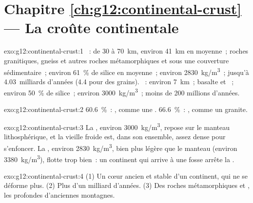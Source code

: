 \section*{Chapitre \ref{ch:g12:continental-crust} --- La croûte continentale}

\begin{solution}{exo:g12:continental-crust:1}
~: de 30 à \qty{70}{km}, environ \qty{41}{km} en
moyenne~; roches granitiques, gneiss et autres roches métamorphiques et
 sous une couverture sédimentaire~; environ \qty{61}{\percent}
de silice en moyenne~; environ \qty{2830}{kg/m^3}~; jusqu'à
4.03~milliards d'années (4.4 pour des grains). ~: environ
\qty{7}{km}~; basalte et ~; environ \qty{50}{\percent} de silice~;
environ \qty{3000}{kg/m^3}~; moins de 200 millions d'années.
\end{solution}

\begin{solution}{exo:g12:continental-crust:2}
\qty{60.6}{\percent}~: , comme une .
\qty{66.6}{\percent}~: , comme un granite.
\end{solution}

\begin{solution}{exo:g12:continental-crust:3}
La , environ \qty{3000}{kg/m^3}, repose sur le manteau
lithosphérique, et la vieille  froide est, dans son
ensemble, assez dense pour s'enfoncer. La , environ
\qty{2830}{kg/m^3}, bien plus légère que le manteau (environ
\qty{3380}{kg/m^3}), flotte trop bien~: un continent qui arrive à une fosse
arrête la .
\end{solution}

\begin{solution}{exo:g12:continental-crust:4}
(1) Un cœur ancien et stable d'un continent, qui ne se déforme plus.
(2) Plus d'un milliard d'années. (3) Des roches métamorphiques et
, les  profondes d'anciennes montagnes.
\end{solution}

